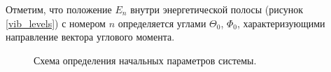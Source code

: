 Отметим, что положение $E_n$ внутри энергетической полосы (рисунок \eqref{vib_levels}) с номером $n$ определяется углами $\Theta_0$, $\Phi_0$, характеризующими направление вектора углового момента. 

\hspace*{-1cm}
\begin{center}
  \begin{figure}[!ht]
    \caption{Схема определения начальных параметров системы.}
  \end{figure}
\end{center}

